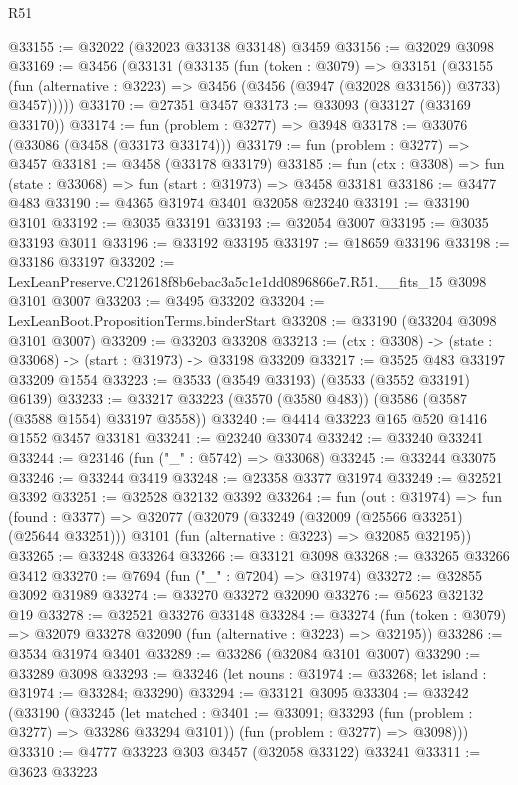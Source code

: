 \begin{lexlean}{R51}
\begin{coremodule}
@33155 := @32022 (@32023 @33138 @33148) @3459
@33156 := @32029 @3098
@33169 := @3456
    (@33131
      (@33135
        (fun (token : @3079) =>
        @33151
          (@33155
            (fun (alternative : @3223) => @3456 (@3456 (@3947 (@32028 @33156)) @3733) @3457)))))
@33170 := @27351 @3457
@33173 := @33093 (@33127 (@33169 @33170))
@33174 := fun (problem : @3277) => @3948
@33178 := @33076 (@33086 (@3458 (@33173 @33174)))
@33179 := fun (problem : @3277) => @3457
@33181 := @3458 (@33178 @33179)
@33185 := fun (ctx : @3308) => fun (state : @33068) => fun (start : @31973) => @3458 @33181
@33186 := @3477 @483
@33190 := @4365 @31974 @3401 @32058 @23240
@33191 := @33190 @3101
@33192 := @3035 @33191
@33193 := @32054 @3007
@33195 := @3035 @33193 @3011
@33196 := @33192 @33195
@33197 := @18659 @33196
@33198 := @33186 @33197
@33202 := LexLeanPreserve.C212618f8b6ebac3a5c1e1dd0896866e7.R51.__fits_15 @3098 @3101 @3007
@33203 := @3495 @33202
@33204 := LexLeanBoot.PropositionTerms.binderStart
@33208 := @33190 (@33204 @3098 @3101 @3007)
@33209 := @33203 @33208
@33213 := (ctx : @3308) -> (state : @33068) -> (start : @31973) -> @33198 @33209
@33217 := @3525 @483 @33197 @33209 @1554
@33223 := @3533 (@3549 @33193) (@3533 (@3552 @33191) @6139)
@33233 := @33217 @33223 (@3570 (@3580 @483)) (@3586 (@3587 (@3588 @1554) @33197 @3558))
@33240 := @4414 @33223 @165 @520 @1416 @1552 @3457 @33181
@33241 := @23240 @33074
@33242 := @33240 @33241
@33244 := @23146 (fun ("_" : @5742) => @33068)
@33245 := @33244 @33075
@33246 := @33244 @3419
@33248 := @23358 @3377 @31974
@33249 := @32521 @3392
@33251 := @32528 @32132 @3392
@33264 := fun (out : @31974) =>
  fun (found : @3377) =>
  @32077
    (@32079
      (@33249 (@32009 (@25566 @33251) (@25644 @33251)))
      @3101
      (fun (alternative : @3223) => @32085 @32195))
@33265 := @33248 @33264
@33266 := @33121 @3098
@33268 := @33265 @33266 @3412
@33270 := @7694 (fun ("_" : @7204) => @31974)
@33272 := @32855 @3092 @31989
@33274 := @33270 @33272 @32090
@33276 := @5623 @32132 @19
@33278 := @32521 @33276 @33148
@33284 := @33274 (fun (token : @3079) => @32079 @33278 @32090 (fun (alternative : @3223) => @32195))
@33286 := @3534 @31974 @3401
@33289 := @33286 (@32084 @3101 @3007)
@33290 := @33289 @3098
@33293 := @33246 (let nouns : @31974 := @33268; let island : @31974 := @33284; @33290)
@33294 := @33121 @3095
@33304 := @33242
    (@33190
      (@33245
        (let matched : @3401 := @33091; @33293 (fun (problem : @3277) => @33286 @33294 @3101))
        (fun (problem : @3277) => @3098)))
@33310 := @4777 @33223 @303 @3457 (@32058 @33122) @33241
@33311 := @3623 @33223

\end{coremodule}
\end{lexlean}
